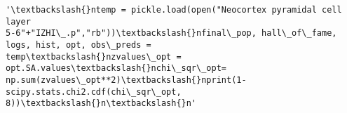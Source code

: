             \begin{tcolorbox}[breakable, size=fbox, boxrule=.5pt, pad at break*=1mm, opacityfill=0]
\begin{Verbatim}[commandchars=\\\{\}]
'\textbackslash{}ntemp = pickle.load(open("Neocortex pyramidal cell layer
5-6"+"IZHI\_.p","rb"))\textbackslash{}nfinal\_pop, hall\_of\_fame, logs, hist, opt, obs\_preds =
temp\textbackslash{}nzvalues\_opt = opt.SA.values\textbackslash{}nchi\_sqr\_opt=
np.sum(zvalues\_opt**2)\textbackslash{}nprint(1-scipy.stats.chi2.cdf(chi\_sqr\_opt, 8))\textbackslash{}n\textbackslash{}n'
\end{Verbatim}
\end{tcolorbox}
        




    